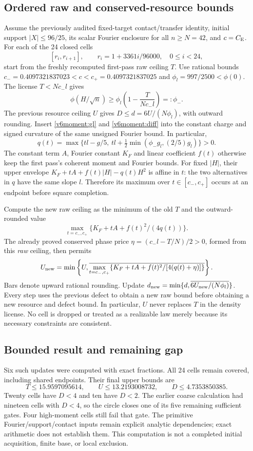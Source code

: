 \subsection{Ordered raw and conserved-resource bounds}
\label{v6moment:update}
Assume the previously audited fixed-target contact/transfer identity,
initial support $|X|\le96/25$, its scalar Fourier enclosure for all
$n\ge N=42$, and $c=C_{\rm E}$. For each of the 24 closed cells
\[
 [r_i,r_{i+1}],\qquad r_i=1+3361i/96000,\quad0\le i<24,
\]
start from the freshly recomputed first-pass raw ceiling $T$.
Use rational bounds $c_-=0.4097321837023<c<c_+=0.4097321837025$ and
$\phi_l=997/2500<\phi(0)$. The license $T<Nc_-l$ gives
\[
 \phi(H/\sqrt n)\ge\phi_l\left(1-\frac{T}{Nc_-l}\right)=:\phi_-.
\]
The previous resource ceiling $U$ gives $D\le d=6U/(N\phi_l)$,
with outward rounding. Insert \eqref{v6moment:gl} and
\eqref{v6moment:diff} into the constant charge and signed curvature
of the same unsigned Fourier bound. In particular,
\[
 q(t)=\max\{tl-g/5,\ tl+\tfrac12\min(\phi_-g_l,(2/5)g_l)\}>0.
\]
The constant term $A$, Fourier constant $K_F$ and linear coefficient
$f(t)$ otherwise keep the first pass's coherent moment and Fourier bounds.
For fixed $|H|$, their upper envelope
$K_F+tA+f(t)|H|-q(t)H^2$ is affine in $t$: the two alternatives
in $q$ have the same slope $l$. Therefore its maximum over
$t\in[c_-,c_+]$ occurs at an endpoint before square completion.

Compute the new raw ceiling as the minimum of the old $T$ and the
outward-rounded value
\[
 \max_{t=c_-,c_+}\{K_F+tA+f(t)^2/(4q(t))\}.
\]
The already proved conserved phase price
$\eta=(c_-l-T/N)/2>0$, formed from this \emph{raw} ceiling, then permits
\[
 U_{\rm new}=\min\left\{U,
 \overline{\max_{t=c_-,c_+}
 \{K_F+tA+f(t)^2/[4(q(t)+\eta)]\}}\right\}.
\]
Bars denote upward rational rounding. Update
$d_{\rm new}=\min\{d,\overline{6U_{\rm new}/(N\phi_l)}\}$.
Every step uses the previous defect to obtain a new raw bound before
obtaining a new resource and defect bound. In particular, $U$ never
replaces $T$ in the density license. No cell is dropped or treated as a
realizable law merely because its necessary constraints are consistent.

\subsection{Bounded result and remaining gap}
Six such updates were computed with exact fractions. All 24 cells remain
covered, including shared endpoints. Their final upper bounds are
\[
 T\le15.9597095614,\qquad U\le13.2193008732,
 \qquad D\le4.7353850385.
\]
Twenty cells have $D<4$ and ten have $D<2$. The earlier coarse calculation
had nineteen cells with $D<4$, so the circle closes one of its five
remaining sufficient gates. Four high-moment cells still fail that gate.
The primitive Fourier/support/contact inputs remain explicit analytic
dependencies; exact arithmetic does not establish them. This computation
is not a completed initial acquisition, finite base, or local exclusion.
